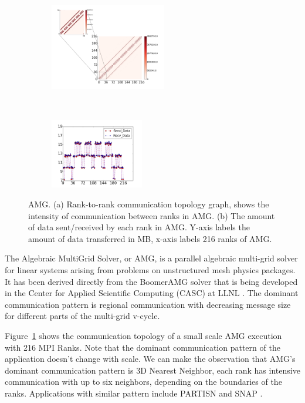 \documentclass[conference]{IEEEtran}
\begin{document}
\begin{figure}[t!]
    \centering
    \begin{subfigure}[t]{0.25\textwidth}
        \centering
        \includegraphics[height=1.5in]{figs/appstudy/amg/amg_pip}
        \caption{}
        \label{fig:amg-communication-topology}
    \end{subfigure}%
    ~
    \begin{subfigure}[t]{0.24\textwidth}
        \centering
        \includegraphics[height=1.2in]{figs/appstudy/amg/amg_data_transfer}
        \caption{}
        \label{fig:amg-data-trans}
    \end{subfigure}
    \caption{AMG. (a) Rank-to-rank communication topology graph, shows the intensity of communication between ranks in AMG. (b) The amount of data sent/received by each rank in AMG. Y-axis labels the amount of data transferred in MB, x-axis labels 216 ranks of AMG. }
\end{figure}

The Algebraic MultiGrid Solver, or AMG, is a parallel algebraic multi-grid solver for linear systems arising from problems on unstructured mesh physics packages. It has been derived directly from the BoomerAMG solver that is being developed in the Center for Applied Scientific Computing (CASC) at LLNL \cite{amg}. The dominant communication pattern is regional communication with decreasing message size for different parts of the multi-grid v-cycle.

Figure~\ref{fig:amg-communication-topology} shows the communication topology of a small scale AMG execution with 216 MPI Ranks. Note that the dominant communication pattern of the application doesn't change with scale. We can make the observation that AMG's dominant communication pattern is 3D Nearest Neighbor, each rank has intensive communication with up to six neighbors, depending on the boundaries of the ranks. Applications with similar pattern include PARTISN \cite{partisn} and SNAP \cite{snap}.
\end{document}
